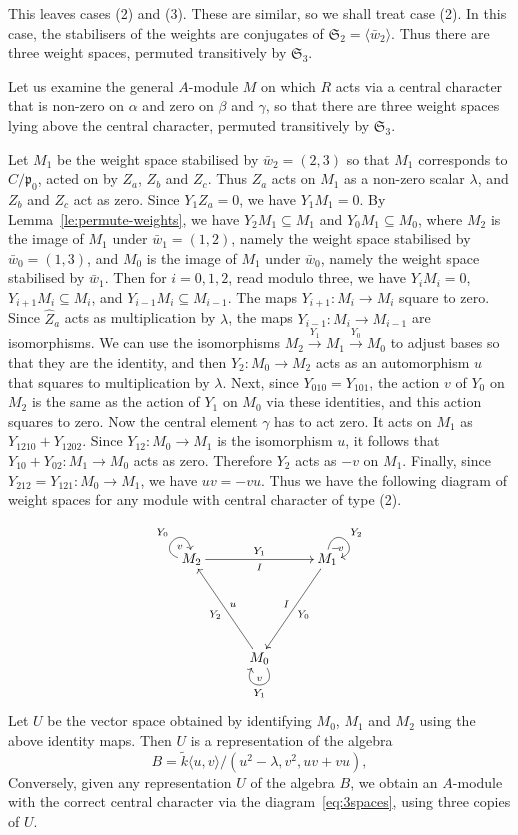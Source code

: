 \documentclass[12pt]{amsart}
\newcommand{\sym}[1]{\mathfrak{S}_{#1}}
\newcommand{\mfp}{\mathfrak{p}}
\numberwithin{equation}{section}
\theoremstyle{definition}
\begin{document}
This leaves cases (2) and (3). These are similar, so we shall treat case (2). In this case, the stabilisers of the weights are conjugates of $\sym{2}=\langle\bar w_2\rangle$. Thus there are three
weight spaces, permuted transitively by $\sym{3}$.

 

Let us examine the general $A$-module $M$ on which $R$ acts via a
central character that is non-zero on $\alpha$ and zero on $\beta$ and
$\gamma$, so that there are three weight spaces lying above the
central character, permuted transitively by $\sym{3}$.

Let $M_1$ be the weight space stabilised by $\bar w_2=(2, 3)$ so that
$M_1$ corresponds to $C/\mfp_0$, acted on by $Z_a$, $Z_b$ and
$Z_c$. Thus $Z_a$ acts on $M_1$ as a non-zero scalar $\lambda$,
and $Z_b$ and $Z_c$ act as zero. Since $Y_1Z_a=0$, we have $Y_1M_1=0$. By Lemma~\ref{le:permute-weights}, we have $Y_2M_1\subseteq M_1$ and
$Y_0M_1\subseteq M_0$, where $M_2$ is the image of $M_1$ under $\bar w_1=(1,2)$, namely the weight space stabilised by $\bar w_0=(1,3)$, and $M_0$ is the image of $M_1$ under $\bar w_0$, namely the weight space stabilised by $\bar w_1$. Then for $i=0,1,2$, read modulo 
three, we have $Y_iM_i=0$, 
$Y_{i+1}M_i\subseteq M_i$, and $Y_{i-1}M_i\subseteq M_{i-1}$. The maps $Y_{i+1}\colon M_i\to M_i$
square to zero. Since $\hat Z_a$ acts as multiplication by $\lambda$, the maps $Y_{i-1}\colon M_i\to M_{i-1}$ are isomorphisms. We can use the
isomorphisms $M_2\xrightarrow{Y_1}M_1\xrightarrow{Y_0}M_0$ to adjust
bases so that they are the identity, and then $Y_2\colon M_0\to M_2$
acts as an automorphism $u$ that squares to multiplication by
$\lambda$. Next, since $Y_{010}=Y_{101}$, the action $v$ of $Y_0$ on $M_2$
is the same as the action of $Y_1$ on $M_0$ via these identities, and
this action squares to zero. Now
the central element $\gamma$ has to act zero. It acts on $M_1$ as 
$Y_{1210}+Y_{1202}$. Since $Y_{12}\colon M_0\to M_1$ is the isomorphism $u$, it follows that $Y_{10}+Y_{02}\colon M_1\to M_0$ acts
as zero. Therefore $Y_2$ acts as $-v$ on $M_1$. Finally, since
$Y_{212}=Y_{121}\colon M_0\to M_1$, we have $uv=-vu$. Thus we have the
following diagram of weight spaces for any module with central
character of type (2).


{\small
\begin{equation}\label{eq:3spaces} 
\vcenter{\xymatrix@R=20mm@C=10mm{M_2\ar[rr]^{Y_{1}}_I\ar@(l,u)[]^{Y_0}_v & 
& M_1\ar[dl]^{Y_{0}}_I\ar@(u,r)[]^{Y_2}_{-\!v\!} \\
&M_0\ar[ul]^{Y_{2}}_{u}\ar@(dr,dl)[]^{Y_1}_v}}
\end{equation}
}%
Let $U$ be the vector space obtained by identifying $M_0$, $M_1$ and
$M_2$ using the above identity maps. Then $U$ is a representation of
the algebra
\[ B=\tilde k\langle u,v\rangle/( u^2-\lambda,v^2,uv+vu), \]
Conversely, given any representation $U$ of the algebra $B$, we obtain
an $A$-module with the correct central character via the 
diagram~\eqref{eq:3spaces}, using three copies of $U$.
\end{document}
